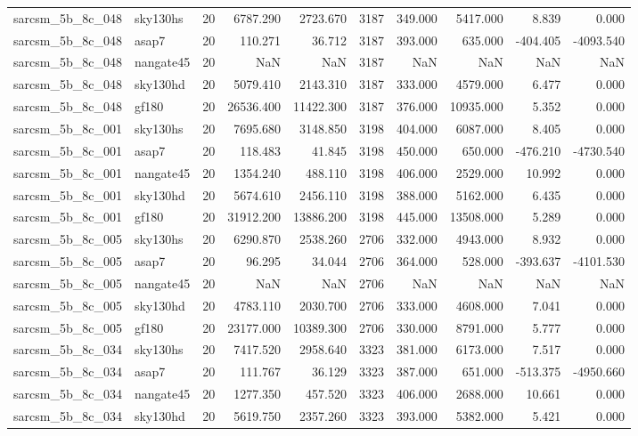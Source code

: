\documentclass{article}
\begin{document}
\begin{longtable}{llrrrrrrrr}
sarcsm\_5b\_8c\_048 & sky130hs & 20 & 6787.290 & 2723.670 & 3187 & 349.000 & 5417.000 & 8.839 & 0.000 \\
sarcsm\_5b\_8c\_048 & asap7 & 20 & 110.271 & 36.712 & 3187 & 393.000 & 635.000 & -404.405 & -4093.540 \\
sarcsm\_5b\_8c\_048 & nangate45 & 20 & NaN & NaN & 3187 & NaN & NaN & NaN & NaN \\
sarcsm\_5b\_8c\_048 & sky130hd & 20 & 5079.410 & 2143.310 & 3187 & 333.000 & 4579.000 & 6.477 & 0.000 \\
sarcsm\_5b\_8c\_048 & gf180 & 20 & 26536.400 & 11422.300 & 3187 & 376.000 & 10935.000 & 5.352 & 0.000 \\
sarcsm\_5b\_8c\_001 & sky130hs & 20 & 7695.680 & 3148.850 & 3198 & 404.000 & 6087.000 & 8.405 & 0.000 \\
sarcsm\_5b\_8c\_001 & asap7 & 20 & 118.483 & 41.845 & 3198 & 450.000 & 650.000 & -476.210 & -4730.540 \\
sarcsm\_5b\_8c\_001 & nangate45 & 20 & 1354.240 & 488.110 & 3198 & 406.000 & 2529.000 & 10.992 & 0.000 \\
sarcsm\_5b\_8c\_001 & sky130hd & 20 & 5674.610 & 2456.110 & 3198 & 388.000 & 5162.000 & 6.435 & 0.000 \\
sarcsm\_5b\_8c\_001 & gf180 & 20 & 31912.200 & 13886.200 & 3198 & 445.000 & 13508.000 & 5.289 & 0.000 \\
sarcsm\_5b\_8c\_005 & sky130hs & 20 & 6290.870 & 2538.260 & 2706 & 332.000 & 4943.000 & 8.932 & 0.000 \\
sarcsm\_5b\_8c\_005 & asap7 & 20 & 96.295 & 34.044 & 2706 & 364.000 & 528.000 & -393.637 & -4101.530 \\
sarcsm\_5b\_8c\_005 & nangate45 & 20 & NaN & NaN & 2706 & NaN & NaN & NaN & NaN \\
sarcsm\_5b\_8c\_005 & sky130hd & 20 & 4783.110 & 2030.700 & 2706 & 333.000 & 4608.000 & 7.041 & 0.000 \\
sarcsm\_5b\_8c\_005 & gf180 & 20 & 23177.000 & 10389.300 & 2706 & 330.000 & 8791.000 & 5.777 & 0.000 \\
sarcsm\_5b\_8c\_034 & sky130hs & 20 & 7417.520 & 2958.640 & 3323 & 381.000 & 6173.000 & 7.517 & 0.000 \\
sarcsm\_5b\_8c\_034 & asap7 & 20 & 111.767 & 36.129 & 3323 & 387.000 & 651.000 & -513.375 & -4950.660 \\
sarcsm\_5b\_8c\_034 & nangate45 & 20 & 1277.350 & 457.520 & 3323 & 406.000 & 2688.000 & 10.661 & 0.000 \\
sarcsm\_5b\_8c\_034 & sky130hd & 20 & 5619.750 & 2357.260 & 3323 & 393.000 & 5382.000 & 5.421 & 0.000 \\

\end{longtable}
\end{document}
